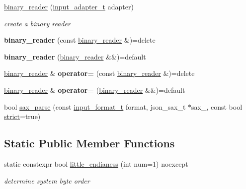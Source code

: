 \begin{DoxyCompactItemize}
\item 
\hyperlink{classnlohmann_1_1detail_1_1binary__reader_aed84f0302eb232d3b69f7653bef2337a}{binary\+\_\+reader} (\hyperlink{namespacenlohmann_1_1detail_ae132f8cd5bb24c5e9b40ad0eafedf1c2}{input\+\_\+adapter\+\_\+t} adapter)
\begin{DoxyCompactList}\small\item\em create a binary reader \end{DoxyCompactList}\item 
\mbox{\label{classnlohmann_1_1detail_1_1binary__reader_aacbece7dfa1698dfb3f22c90922d7244}} 
{\bfseries binary\+\_\+reader} (const \hyperlink{classnlohmann_1_1detail_1_1binary__reader}{binary\+\_\+reader} \&)=delete
\item 
\mbox{\label{classnlohmann_1_1detail_1_1binary__reader_a254d91b10c2f4579634b6f70ffc1ef16}} 
{\bfseries binary\+\_\+reader} (\hyperlink{classnlohmann_1_1detail_1_1binary__reader}{binary\+\_\+reader} \&\&)=default
\item 
\mbox{\label{classnlohmann_1_1detail_1_1binary__reader_a87826b833ee7fec146c97233bb0f6ab8}} 
\hyperlink{classnlohmann_1_1detail_1_1binary__reader}{binary\+\_\+reader} \& {\bfseries operator=} (const \hyperlink{classnlohmann_1_1detail_1_1binary__reader}{binary\+\_\+reader} \&)=delete
\item 
\mbox{\label{classnlohmann_1_1detail_1_1binary__reader_a7ba0e555da725a2efa17048e67aec9a9}} 
\hyperlink{classnlohmann_1_1detail_1_1binary__reader}{binary\+\_\+reader} \& {\bfseries operator=} (\hyperlink{classnlohmann_1_1detail_1_1binary__reader}{binary\+\_\+reader} \&\&)=default
\item 
bool \hyperlink{classnlohmann_1_1detail_1_1binary__reader_ab94a54d6e595c2620b07589cf4116256}{sax\+\_\+parse} (const \hyperlink{namespacenlohmann_1_1detail_aa554fc6a11519e4f347deb25a9f0db40}{input\+\_\+format\+\_\+t} format, json\+\_\+sax\+\_\+t $\ast$sax\+\_\+, const bool \hyperlink{namespacenlohmann_1_1detail_a5a76b60b26dc8c47256a996d18d967dfa2133fd717402a7966ee88d06f9e0b792}{strict}=true)
\end{DoxyCompactItemize}
\subsection*{Static Public Member Functions}
\begin{DoxyCompactItemize}
\item 
static constexpr bool \hyperlink{classnlohmann_1_1detail_1_1binary__reader_a1e31dbfcf9567c8c2d4f0e4eb1b0230a}{little\+\_\+endianess} (int num=1) noexcept
\begin{DoxyCompactList}\small\item\em determine system byte order \end{DoxyCompactList}\end{DoxyCompactItemize}


